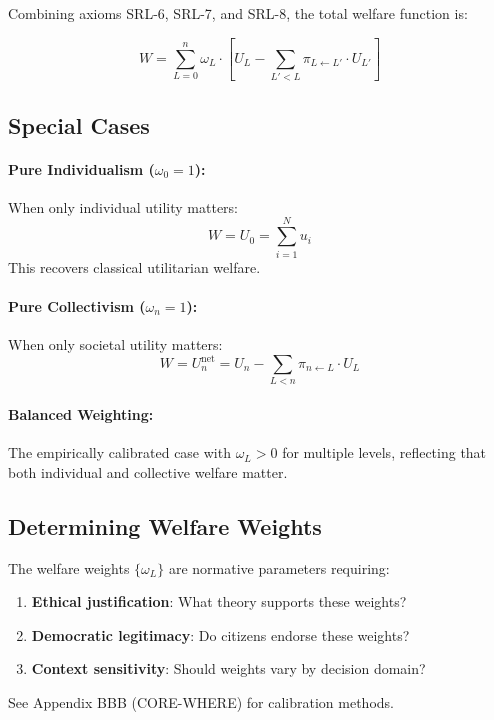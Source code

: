 Combining axioms SRL-6, SRL-7, and SRL-8, the total welfare function is:

\begin{equation}
W = \sum_{L=0}^{n} \omega_L \cdot \left[ U_L - \sum_{L' < L} \pi_{L \leftarrow L'} \cdot U_{L'} \right]
\label{eq:who-full-aggregation}
\end{equation}

\subsection{Special Cases}

\paragraph{Pure Individualism ($\omega_0 = 1$):}
When only individual utility matters:
\[
W = U_0 = \sum_{i=1}^{N} u_i
\]
This recovers classical utilitarian welfare.

\paragraph{Pure Collectivism ($\omega_n = 1$):}
When only societal utility matters:
\[
W = U_n^{\text{net}} = U_n - \sum_{L < n} \pi_{n \leftarrow L} \cdot U_L
\]

\paragraph{Balanced Weighting:}
The empirically calibrated case with $\omega_L > 0$ for multiple levels,
reflecting that both individual and collective welfare matter.

\subsection{Determining Welfare Weights}

The welfare weights $\{\omega_L\}$ are normative parameters requiring:

\begin{enumerate}
\item \textbf{Ethical justification}: What theory supports these weights?
\item \textbf{Democratic legitimacy}: Do citizens endorse these weights?
\item \textbf{Context sensitivity}: Should weights vary by decision domain?
\end{enumerate}

See Appendix BBB (CORE-WHERE) for calibration methods.



